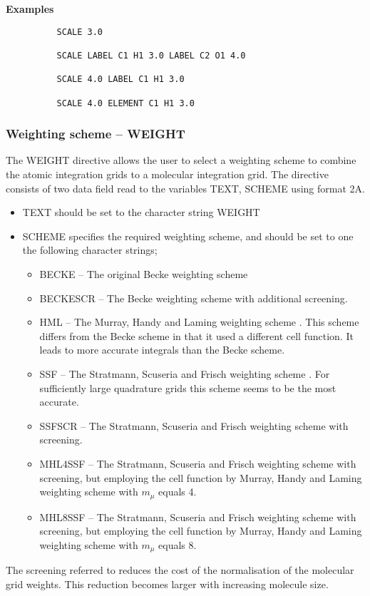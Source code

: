 \documentclass[11pt,fleqn]{article}
\begin{document}
{\bf Examples}

{
\footnotesize
\begin{verbatim}
          SCALE 3.0

          SCALE LABEL C1 H1 3.0 LABEL C2 O1 4.0

          SCALE 4.0 LABEL C1 H1 3.0

          SCALE 4.0 ELEMENT C1 H1 3.0
\end{verbatim}
}


\subsubsection{Weighting scheme -- WEIGHT}

The WEIGHT directive allows the user to select a weighting scheme to
combine the atomic integration grids to a molecular integration grid.
The directive consists of two data field read to the variables TEXT,
SCHEME using format 2A.
\begin{itemize}
\item TEXT should be set to the character string WEIGHT
\item SCHEME specifies the required weighting scheme, and should
be set to one the following character strings;
\begin{itemize}
\item BECKE -- The original Becke weighting scheme  \cite{becke88a}
\item BECKESCR --
The Becke weighting scheme \cite{becke88a} with additional screening.
\item HML -- The Murray, Handy and Laming weighting scheme \cite{murray93}.
This scheme differs from the Becke scheme in that it used a different
cell function. It leads to more accurate integrals than the Becke scheme.
\item SSF -- The Stratmann, Scuseria and Frisch weighting scheme \cite{strat96}.
For sufficiently large quadrature grids this scheme seems to be the most
accurate.
\item SSFSCR -- The Stratmann, Scuseria and Frisch weighting scheme 
      \cite{strat96} with screening.
\item MHL4SSF -- The Stratmann, Scuseria and Frisch weighting scheme 
      \cite{strat96} with screening, but employing the cell function by Murray,
      Handy and Laming weighting scheme \cite{murray93} with $m_\mu$ equals 4.
\item MHL8SSF -- The Stratmann, Scuseria and Frisch weighting scheme 
      \cite{strat96} with screening, but employing the cell function by Murray,
      Handy and Laming weighting scheme \cite{murray93} with $m_\mu$ equals 8.
\end{itemize}
\end{itemize}
The screening referred to reduces the cost of the normalisation of the molecular
grid weights. This reduction becomes larger with increasing molecule size.
\end{document}
